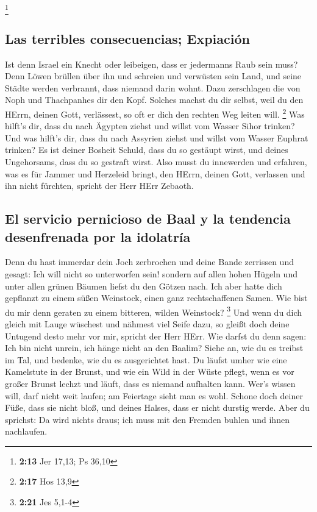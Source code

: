 \footnote{\textbf{2:13} Jer 17,13; Ps 36,10}

\hypertarget{las-terribles-consecuencias-expiaciuxf3n}{%
\subsection{Las terribles consecuencias;
Expiación}\label{las-terribles-consecuencias-expiaciuxf3n}}

 Ist denn Israel ein Knecht oder leibeigen, dass er
jedermanns Raub sein muss?  Denn Löwen brüllen über ihn
und schreien und verwüsten sein Land, und seine Städte werden verbrannt,
dass niemand darin wohnt.  Dazu zerschlagen die von Noph
und Thachpanhes dir den Kopf.  Solches machst du dir
selbst, weil du den HErrn, deinen Gott, verlässest, so oft er dich den
rechten Weg leiten will. \footnote{\textbf{2:17} Hos 13,9}
 Was hilft's dir, dass du nach Ägypten ziehst und willst
vom Wasser Sihor trinken? Und was hilft's dir, dass du nach Assyrien
ziehst und willst vom Wasser Euphrat trinken?  Es ist
deiner Bosheit Schuld, dass du so gestäupt wirst, und deines
Ungehorsams, dass du so gestraft wirst. Also musst du innewerden und
erfahren, was es für Jammer und Herzeleid bringt, den HErrn, deinen
Gott, verlassen und ihn nicht fürchten, spricht der Herr HErr Zebaoth.

\hypertarget{el-servicio-pernicioso-de-baal-y-la-tendencia-desenfrenada-por-la-idolatruxeda}{%
\subsection{El servicio pernicioso de Baal y la tendencia desenfrenada
por la
idolatría}\label{el-servicio-pernicioso-de-baal-y-la-tendencia-desenfrenada-por-la-idolatruxeda}}

 Denn du hast immerdar dein Joch zerbrochen und deine
Bande zerrissen und gesagt: Ich will nicht so unterworfen sein! sondern
auf allen hohen Hügeln und unter allen grünen Bäumen liefst du den
Götzen nach.  Ich aber hatte dich gepflanzt zu einem
süßen Weinstock, einen ganz rechtschaffenen Samen. Wie bist du mir denn
geraten zu einem bitteren, wilden Weinstock? \footnote{\textbf{2:21} Jes
  5,1-4}  Und wenn du dich gleich mit Lauge wüschest und
nähmest viel Seife dazu, so gleißt doch deine Untugend desto mehr vor
mir, spricht der Herr HErr.  Wie darfst du denn sagen:
Ich bin nicht unrein, ich hänge nicht an den Baalim? Siehe an, wie du es
treibst im Tal, und bedenke, wie du es ausgerichtet hast.
 Du läufst umher wie eine Kamelstute in der Brunst, und
wie ein Wild in der Wüste pflegt, wenn es vor großer Brunst lechzt und
läuft, dass es niemand aufhalten kann. Wer's wissen will, darf nicht
weit laufen; am Feiertage sieht man es wohl.  Schone doch
deiner Füße, dass sie nicht bloß, und deines Halses, dass er nicht
durstig werde. Aber du sprichst: Da wird nichts draus; ich muss mit den
Fremden buhlen und ihnen nachlaufen.

